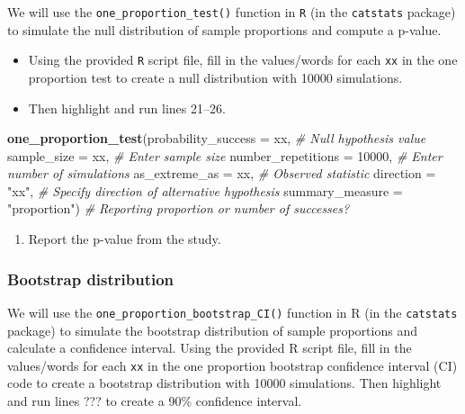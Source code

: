 \documentclass[
]{report}
\newenvironment{Shaded}{\begin{snugshade}}{\end{snugshade}}
\newcommand{\AttributeTok}[1]{\textcolor[rgb]{0.13,0.29,0.53}{#1}}
\newcommand{\CommentTok}[1]{\textcolor[rgb]{0.56,0.35,0.01}{\textit{#1}}}
\newcommand{\DecValTok}[1]{\textcolor[rgb]{0.00,0.00,0.81}{#1}}
\newcommand{\FunctionTok}[1]{\textcolor[rgb]{0.13,0.29,0.53}{\textbf{#1}}}
\newcommand{\NormalTok}[1]{#1}
\newcommand{\StringTok}[1]{\textcolor[rgb]{0.31,0.60,0.02}{#1}}
\providecommand{\tightlist}{%
  \setlength{\itemsep}{0pt}\setlength{\parskip}{0pt}}
\begin{document}
We will use the \texttt{one\_proportion\_test()} function in \texttt{R} (in the \texttt{catstats} package) to simulate the null distribution of sample proportions and compute a p-value.

\begin{itemize}
\item
  Using the provided \texttt{R} script file, fill in the values/words for each \texttt{xx} in the one proportion test to create a null distribution with 10000 simulations.
\item
  Then highlight and run lines 21--26.
\end{itemize}

\begin{Shaded}
\begin{Highlighting}[]
\FunctionTok{one\_proportion\_test}\NormalTok{(}\AttributeTok{probability\_success =}\NormalTok{ xx, }\CommentTok{\# Null hypothesis value}
          \AttributeTok{sample\_size =}\NormalTok{ xx, }\CommentTok{\# Enter sample size}
          \AttributeTok{number\_repetitions =} \DecValTok{10000}\NormalTok{, }\CommentTok{\# Enter number of simulations}
          \AttributeTok{as\_extreme\_as =}\NormalTok{ xx, }\CommentTok{\# Observed statistic}
          \AttributeTok{direction =} \StringTok{"xx"}\NormalTok{, }\CommentTok{\# Specify direction of alternative hypothesis}
          \AttributeTok{summary\_measure =} \StringTok{"proportion"}\NormalTok{) }\CommentTok{\# Reporting proportion or number of successes?}
\end{Highlighting}
\end{Shaded}

\begin{enumerate}
\def\labelenumi{\arabic{enumi}.}
\setcounter{enumi}{5}
\tightlist
\item
  Report the p-value from the study.
\end{enumerate}

\vspace{0.2in}

\subsubsection*{Bootstrap distribution}\label{bootstrap-distribution}

We will use the \texttt{one\_proportion\_bootstrap\_CI()} function in R (in the \texttt{catstats} package) to simulate the bootstrap distribution of sample proportions and calculate a confidence interval. Using the provided R script file, fill in the values/words for each \texttt{xx} in the one proportion bootstrap confidence interval (CI) code to create a bootstrap distribution with 10000 simulations. Then highlight and run lines ??? to create a 90\% confidence interval.
\end{document}
